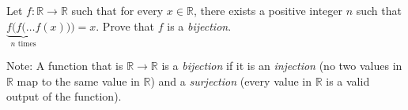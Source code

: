 Let $f:\mathbb{R}\to\mathbb{R}$ such that for every $x\in\mathbb{R}$, there exists a positive integer $n$ such that $\underbrace{f(f(\ldots f}_{n\text{ times}}(x)))=x$. Prove that $f$ is a \emph{bijection}.
	
	Note: A function that is $\mathbb{R}\to\mathbb{R}$ is a \emph{bijection} if it is an \emph{injection} (no two values in $\mathbb{R}$ map to the same value in $\mathbb{R}$) and a \emph{surjection} (every value in $\mathbb{R}$ is a valid output of the function).